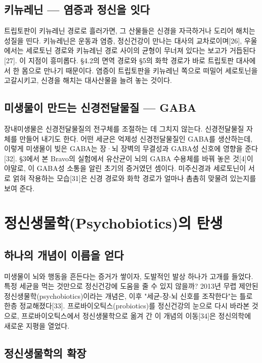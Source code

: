 \documentclass[12pt,oneside]{book}
\begin{document}
\subsection{키뉴레닌 — 염증과 정신을 잇다}

트립토판이 키뉴레닌 경로로 흘러가면, 그 산물들은 신경을 자극하거나 도리어 해치는 성질을 띤다. 키뉴레닌은 운동과 염증, 정신건강이 만나는 대사의 교차로이며[26], 우울에서는 세로토닌 경로와 키뉴레닌 경로 사이의 균형이 무너져 있다는 보고가 거듭된다[27]. 이 지점이 흥미롭다. §4.2의 면역 경로와 §5의 화학 경로가 바로 트립토판 대사에서 한 몸으로 만나기 때문이다. 염증이 트립토판을 키뉴레닌 쪽으로 떠밀어 세로토닌을 고갈시키고, 신경을 해치는 대사산물을 늘려 놓는 것이다.

\subsection{미생물이 만드는 신경전달물질 — GABA}

장내미생물은 신경전달물질의 전구체를 조절하는 데 그치지 않는다. 신경전달물질 자체를 만들어 내기도 한다. 어떤 세균은 억제성 신경전달물질인 GABA를 생산하는데, 이렇게 미생물이 빚은 GABA는 장·뇌 장벽의 무결성과 GABA성 신호에 영향을 준다[32]. §3에서 본 Bravo의 실험에서 유산균이 뇌의 GABA 수용체를 바꿔 놓은 것[4]이야말로, 이 GABA성 소통을 알린 초기의 증거였던 셈이다. 미주신경과 세로토닌이 서로 얽혀 작용하는 모습[31]은 신경 경로와 화학 경로가 얼마나 촘촘히 맞물려 있는지를 보여 준다.

\section{정신생물학(Psychobiotics)의 탄생}

\subsection{하나의 개념이 이름을 얻다}

미생물이 뇌와 행동을 흔든다는 증거가 쌓이자, 도발적인 발상 하나가 고개를 들었다. 특정 세균을 먹는 것만으로 정신건강에 도움을 줄 수 있지 않을까? 2013년 무렵 제안된 정신생물학(psychobiotics)이라는 개념은, 이후 "세균-장-뇌 신호를 조작한다"는 틀로 한층 정교해졌다[33]. 프로바이오틱스(probiotics)를 정신건강의 눈으로 다시 바라본 것으로, 프로바이오틱스에서 정신생물학으로 옮겨 간 이 개념의 이동[34]은 정신의학에 새로운 지평을 열었다.

\subsection{정신생물학의 확장}
\end{document}

